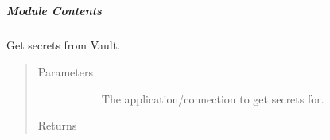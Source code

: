 \documentclass[letterpaper,10pt,english]{sphinxmanual}
\begin{document}

\begin{fulllineitems}
\label{\detokenize{autoapi/src/utils/snowflake/index:id0}}
\end{fulllineitems}



\subparagraph{}
\label{\detokenize{autoapi/src/utils/vault/index:module-src.utils.vault}}\label{\detokenize{autoapi/src/utils/vault/index:src-utils-vault}}\label{\detokenize{autoapi/src/utils/vault/index::doc}}

\subparagraph{Module Contents}
\label{\detokenize{autoapi/src/utils/vault/index:module-contents}}

\begin{fulllineitems}
\label{\detokenize{autoapi/src/utils/vault/index:src.utils.vault.get_secrets}}
Get secrets from Vault.
\begin{quote}\begin{description}
\item[{Parameters}] \leavevmode\begin{description}
\item[{}] \leavevmode
The application/connection to get secrets for.

\end{description}

\item[{Returns}] \leavevmode\begin{description}
\item[{ }] \leavevmode
\end{description}

\end{description}\end{quote}

\end{fulllineitems}
\end{document}

